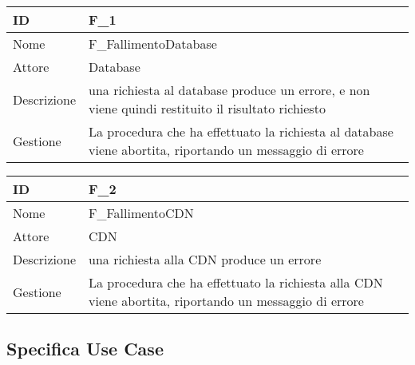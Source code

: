 \begin{tabular}{ |p{2cm}|p{10cm}|  }
\hline
ID & F\_1\\\hline
Nome & F\_FallimentoDatabase\\\hline
Attore & Database\\\hline
Descrizione & una richiesta al database produce un errore, e non viene quindi restituito il risultato richiesto\\\hline
Gestione &  La procedura che ha effettuato la richiesta al database viene abortita, riportando un messaggio di errore \\\hline
\end{tabular}
\label{table_fail:1}\newline

\begin{tabular}{ |p{2cm}|p{10cm}|  }
\hline
ID & F\_2\\\hline
Nome & F\_FallimentoCDN\\\hline
Attore & CDN\\\hline
Descrizione & una richiesta alla CDN produce un errore\\\hline
Gestione &  La procedura che ha effettuato la richiesta alla CDN viene abortita, riportando un messaggio di errore \\\hline
\end{tabular}
\label{table_fail:2}\newline

\subsection{Specifica Use Case}


